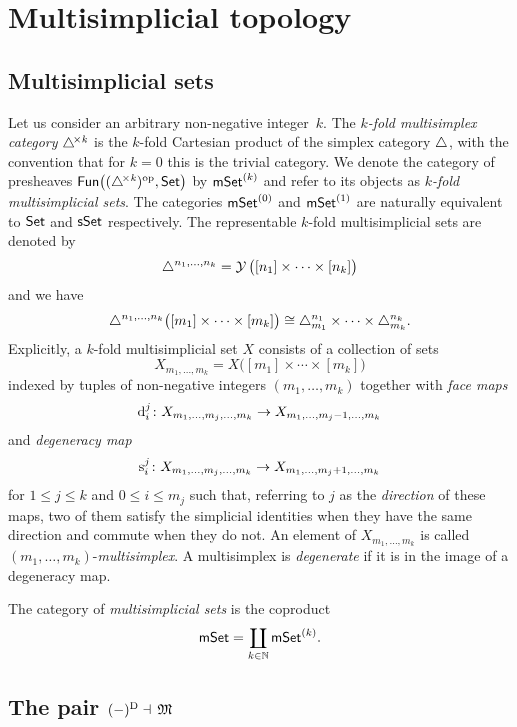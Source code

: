 
\section{Multisimplicial topology}


\subsection{Multisimplicial sets}

Let us consider an arbitrary non-negative integer~$k$.
The \textit{$k$-fold multisimplex category} $\triangle^{\!\times\mathit{k}}$ is the $k$-fold Cartesian product of the simplex category $\triangle$, with the convention that for $k = 0$ this is the trivial category.
We denote the category of presheaves $\mathsf{Fun} \big( (\triangle^{\!\times\mathit{k}})^{\mathrm{op}}, \mathsf{Set} \big)$ by $\mathsf{mSet}^{(k)}$ and refer to its objects as \textit{$k$-fold multisimplicial sets}.
The categories $\mathsf{mSet}^{(0)}$ and $\mathsf{mSet}^{(1)}$ are naturally equivalent to $\mathsf{Set}$ and $\mathsf{sSet}$ respectively.
The representable $k$-fold multisimplicial sets are denoted by
\[
\triangle^{n_1, \dots, n_k} =
\operatorname{\mathcal{Y}} \big( [n_1] \times \cdots \times [n_k] \big)
\]
and we have
\[
\triangle^{n_1, \dots, n_k} \big( [m_1] \times \cdots \times [m_k] \big) \cong
\triangle^{n_1}_{m_1} \times \dots \times \triangle^{n_k}_{m_k}.
\]
Explicitly, a $k$-fold multisimplicial set $X$ consists of a collection of sets
\[
X_{m_1, \dots, m_k} =
X \big( [m_1] \times \cdots \times [m_k] \big)
\]
indexed by tuples of non-negative integers $(m_1, \dots, m_k)$ together with \textit{face maps}
\[
\operatorname{d}_i^j \colon
X_{m_1, \dots, m_j, \dots, m_k} \to
X_{m_1, \dots, m_j-1, \dots, m_k}
\]
and \textit{degeneracy map}
\[
\operatorname{s}^j_i \colon X_{m_1, \dots, m_j, \dots, m_k} \to X_{m_1, \dots, m_j+1, \dots, m_k}
\]
for $1 \leq j \leq k$ and $0 \leq i \leq m_j$ such that, referring to $j$ as the \textit{direction} of these maps, two of them satisfy the simplicial identities when they have the same direction and commute when they do not.
An element of $X_{m_1, \dots, m_k}$ is called
$(m_1, \dots, m_k)$-\textit{multisimplex}.
A multisimplex is \textit{degenerate} if it is in the image of a degeneracy map.

The category of \textit{multisimplicial sets} is the coproduct
\[
\mathsf{mSet} = \coprod_{k \in \mathbb{N}} \mathsf{mSet}^{(k)}.
\]

\subsection{The pair $(-)^{\mathrm{D}} \dashv \, \operatorname{\mathfrak{M}}$} \label{ss:diagonal simplicial set}

